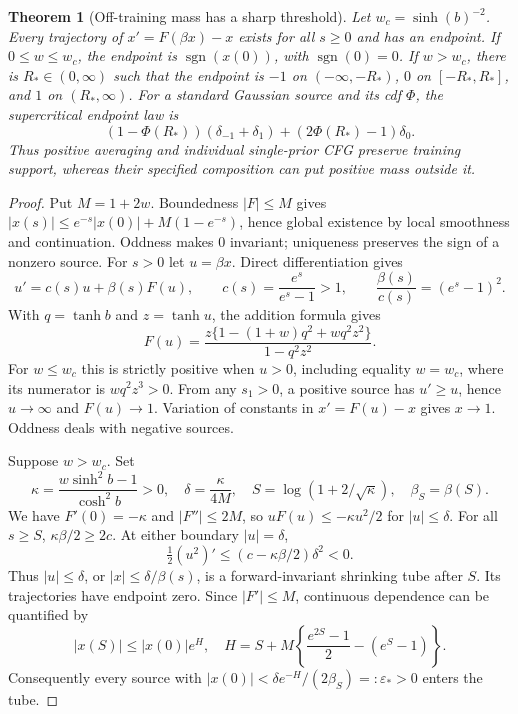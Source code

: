 \documentclass[11pt]{article}
\newtheorem{theorem}{Theorem}
\newcommand{\eps}{\varepsilon}
\begin{document}
\begin{theorem}[Off-training mass has a sharp threshold]\label{thm:phase}
Let $w_c=\sinh(b)^{-2}$. Every trajectory of
$x'=F(\beta x)-x$ exists for all $s\ge0$ and has an endpoint.
If $0\le w\le w_c$, the endpoint is $\operatorname{sgn}(x(0))$,
with $\operatorname{sgn}(0)=0$.
If $w>w_c$, there is $R_*\in(0,\infty)$ such that the endpoint is
$-1$ on $(-\infty,-R_*)$, $0$ on $[-R_*,R_*]$, and $1$ on
$(R_*,\infty)$. For a standard Gaussian source and its cdf $\Phi$, the
supercritical endpoint law is
\[
 (1-\Phi(R_*))(\delta_{-1}+\delta_1)
 +(2\Phi(R_*)-1)\delta_0.
\]
Thus positive averaging and individual single-prior CFG preserve training
support, whereas their specified composition can put positive mass outside it.
\end{theorem}
\begin{proof}
Put $M=1+2w$. Boundedness $|F|\le M$ gives
$|x(s)|\le e^{-s}|x(0)|+M(1-e^{-s})$, hence global existence by local
smoothness and continuation. Oddness makes $0$ invariant; uniqueness preserves
the sign of a nonzero source. For $s>0$ let $u=\beta x$. Direct differentiation
gives
\[
 u'=c(s)u+\beta(s)F(u),\qquad
 c(s)=\frac{e^s}{e^s-1}>1,\qquad
 \frac{\beta(s)}{c(s)}=(e^s-1)^2.
\]
With $q=\tanh b$ and $z=\tanh u$, the addition formula gives
\begin{equation}\label{eq:factor}
 F(u)=\frac{z\{1-(1+w)q^2+wq^2z^2\}}{1-q^2z^2}.
\end{equation}
For $w\le w_c$ this is strictly positive when $u>0$, including equality
$w=w_c$, where its numerator is $wq^2z^3>0$. From any $s_1>0$, a positive
source has $u'\ge u$, hence $u\to\infty$ and $F(u)\to1$. Variation of
constants in $x'=F(u)-x$ gives $x\to1$. Oddness deals with negative sources.

Suppose $w>w_c$. Set
\[
 \kappa=\frac{w\sinh^2b-1}{\cosh^2b}>0,\quad
 \delta=\frac\kappa{4M},\quad
 S=\log(1+2/\sqrt\kappa),\quad \beta_S=\beta(S).
\]
We have $F'(0)=-\kappa$ and $|F''|\le2M$, so
$uF(u)\le-\kappa u^2/2$ for $|u|\le\delta$. For all $s\ge S$,
$\kappa\beta/2\ge2c$. At either boundary $|u|=\delta$,
\[
 \tfrac12(u^2)'\le(c-\kappa\beta/2)\delta^2<0.
\]
Thus $|u|\le\delta$, or $|x|\le\delta/\beta(s)$, is a forward-invariant
shrinking tube after $S$. Its trajectories have endpoint zero.
Since $|F'|\le M$, continuous dependence can be quantified by
\[
 |x(S)|\le |x(0)|e^{H},\quad
 H=S+M\left\{\frac{e^{2S}-1}{2}-(e^S-1)\right\}.
\]
Consequently every source with
$|x(0)|<\delta e^{-H}/(2\beta_S)=:\eps_*>0$
enters the tube.


\end{proof}
\end{document}
